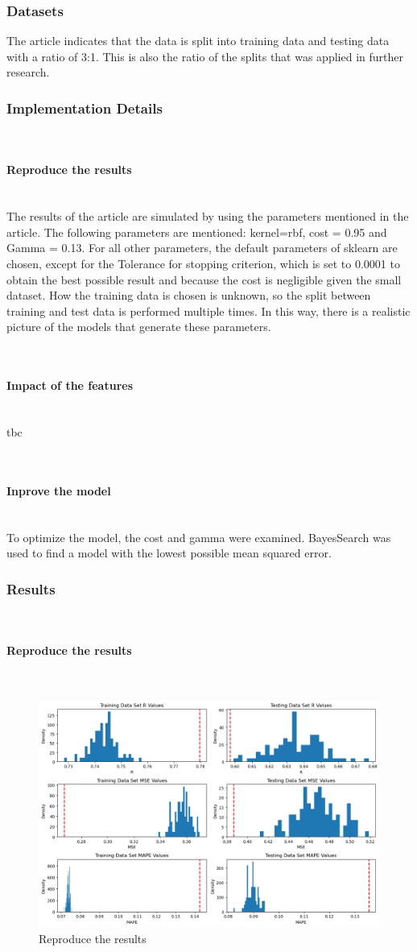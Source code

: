\documentclass{article}
\newcommand{\subsubsubsection}[1]{%
  \paragraph{#1}\mbox{}\\}
\begin{document}
\subsubsection{Datasets}
The article indicates that the data is split into training data and testing data with a ratio of 3:1. This is also the ratio of the splits that was applied in further research.

\subsubsection{Implementation Details}

\subsubsubsection{Reproduce the results}
The results of the article are simulated by using the parameters mentioned in the article. The following parameters are mentioned: kernel=rbf, cost = 0.95 and Gamma = 0.13. For all other parameters, the default parameters of sklearn are chosen, except for the Tolerance for stopping criterion, which is set to 0.0001 to obtain the best possible result and because the cost is negligible given the small dataset.
How the training data is chosen is unknown, so the split between training and test data is performed multiple times. In this way, there is a realistic picture of the models that generate these parameters.

\subsubsubsection{Impact of the features}
tbc

\subsubsubsection{Inprove the model}
To optimize the model, the cost and gamma were examined. BayesSearch was used to find a model with the lowest possible mean squared error. 

\subsubsection{Results}

\subsubsubsection{Reproduce the results}
\begin{figure}
\centering
\includegraphics[width=\linewidth]{figures/SVR_reproduce_the_results.png}
\caption{Reproduce the results}
\label{fig:Reproduce-SVR-the-results}
\end{figure}
\end{document}
